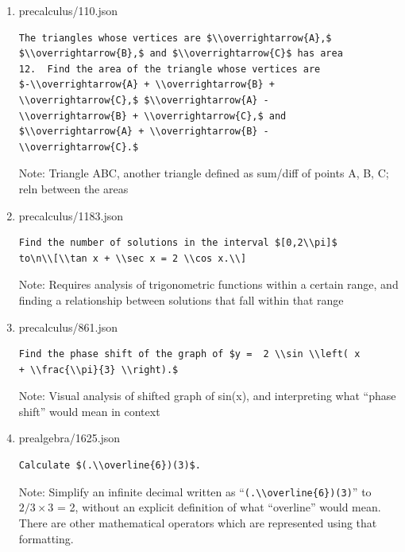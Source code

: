 \documentclass[11pt,a4paper]{article}
\begin{document}
\begin{enumerate}
  \item precalculus/110.json
\begin{verbatim}
The triangles whose vertices are $\\overrightarrow{A},$
$\\overrightarrow{B},$ and $\\overrightarrow{C}$ has area
12.  Find the area of the triangle whose vertices are
$-\\overrightarrow{A} + \\overrightarrow{B} +
\\overrightarrow{C},$ $\\overrightarrow{A} -
\\overrightarrow{B} + \\overrightarrow{C},$ and
$\\overrightarrow{A} + \\overrightarrow{B} -
\\overrightarrow{C}.$
\end{verbatim}
    Note: Triangle ABC, another triangle defined as sum/diff of points A, B, C; reln between the areas

  \item precalculus/1183.json
\begin{verbatim}
Find the number of solutions in the interval $[0,2\\pi]$
to\n\\[\\tan x + \\sec x = 2 \\cos x.\\]
\end{verbatim}
    Note: Requires analysis of trigonometric functions within a certain range, and finding a relationship between solutions that fall within that range

  \item precalculus/861.json
\begin{verbatim}
Find the phase shift of the graph of $y =  2 \\sin \\left( x
+ \\frac{\\pi}{3} \\right).$
\end{verbatim}
    Note: Visual analysis of shifted graph of sin(x), and interpreting what “phase shift” would mean in context

  \item prealgebra/1625.json
\begin{verbatim}
Calculate $(.\\overline{6})(3)$.
\end{verbatim}
    Note: Simplify an infinite decimal written as
    ``\verb|(.\\overline{6})(3)|'' to $2/3 \times 3$ = 2,
    without an explicit definition of what ``overline''
    would mean. There are other mathematical operators
    which are represented using that formatting.


\end{enumerate}
\end{document}
